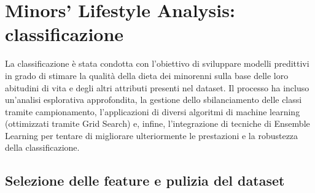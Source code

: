 \chapter{Minors' Lifestyle Analysis: classificazione} %




La classificazione è stata condotta con l'obiettivo di sviluppare modelli predittivi in grado di stimare la qualità della dieta dei minorenni sulla base delle loro abitudini di vita e degli altri attributi presenti nel dataset. Il processo ha incluso un'analisi esplorativa approfondita, la gestione dello sbilanciamento delle classi tramite campionamento, l'applicazioni di diversi algoritmi di machine learning (ottimizzati tramite Grid Search) e, infine, l'integrazione di tecniche di Ensemble Learning per tentare di migliorare ulteriormente le prestazioni e la robustezza della classificazione.

\section{Selezione delle feature e pulizia del dataset}

